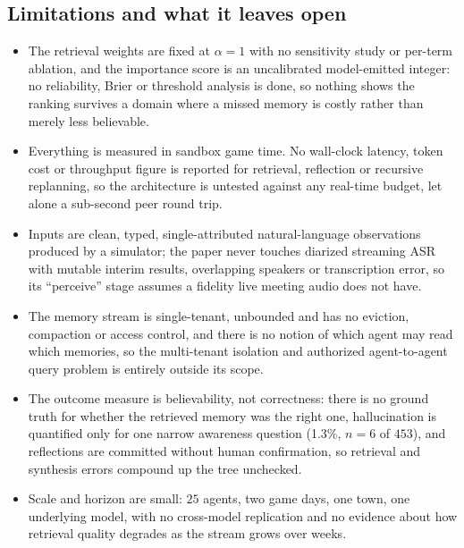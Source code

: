 \subsection{Limitations and what it leaves open}
\begin{itemize}[leftmargin=1.2em, itemsep=1pt, topsep=2pt]
  \item The retrieval weights are fixed at $\alpha=1$ with no sensitivity study or per-term ablation, and the importance score is an uncalibrated model-emitted integer: no reliability, Brier or threshold analysis is done, so nothing shows the ranking survives a domain where a missed memory is costly rather than merely less believable.
  \item Everything is measured in sandbox game time. No wall-clock latency, token cost or throughput figure is reported for retrieval, reflection or recursive replanning, so the architecture is untested against any real-time budget, let alone a sub-second peer round trip.
  \item Inputs are clean, typed, single-attributed natural-language observations produced by a simulator; the paper never touches diarized streaming ASR with mutable interim results, overlapping speakers or transcription error, so its ``perceive'' stage assumes a fidelity live meeting audio does not have.
  \item The memory stream is single-tenant, unbounded and has no eviction, compaction or access control, and there is no notion of which agent may read which memories, so the multi-tenant isolation and authorized agent-to-agent query problem is entirely outside its scope.
  \item The outcome measure is believability, not correctness: there is no ground truth for whether the retrieved memory was the right one, hallucination is quantified only for one narrow awareness question (1.3\%, $n=6$ of $453$), and reflections are committed without human confirmation, so retrieval and synthesis errors compound up the tree unchecked.
  \item Scale and horizon are small: $25$ agents, two game days, one town, one underlying model, with no cross-model replication and no evidence about how retrieval quality degrades as the stream grows over weeks.
\end{itemize}
